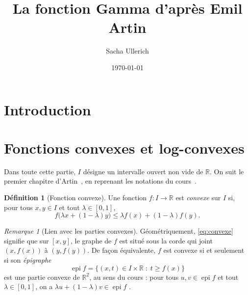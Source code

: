 \documentclass[11pt,a4paper]{amsart}
\theoremstyle{plain}
\theoremstyle{definition}
\newtheorem{definition}[theoreme]{Définition}
\theoremstyle{remark}
\newtheorem{remarque}[theoreme]{Remarque}
\numberwithin{equation}{section}
\newcommand{\R}{\mathbb{R}}
\begin{document}
\title{La fonction Gamma d'après Emil Artin}

\author{Sacha Ullerich}
\address{Faculté des Sciences et Techniques, Université de Limoges}
\date{\today}

\maketitle


\section{Introduction}

\section{Fonctions convexes et log-convexes}

Dans toute cette partie, $I$ désigne un intervalle ouvert non vide de $\R$.
On suit le premier chapitre d'Artin~\cite[ch.~1]{artin}, en reprenant les
notations du cours~\cite{igbida}.

\begin{definition}[Fonction convexe]\label{def:convexe}
Une fonction $f\colon I\to\R$ est \emph{convexe} sur $I$ si, pour tous
$x,y\in I$ et tout $\lambda\in[0,1]$,
\begin{equation}\label{eq:convexe}
  f\bigl(\lambda x+(1-\lambda)y\bigr)\le \lambda f(x)+(1-\lambda)f(y).
\end{equation}
\end{definition}

\begin{remarque}[Lien avec les parties convexes]\label{rem:epigraphe}
Géométriquement, \eqref{eq:convexe} signifie que sur $[x,y]$, le graphe de
$f$ est situé sous la corde qui joint $(x,f(x))$ à $(y,f(y))$. De façon
équivalente, $f$ est convexe si et seulement si son \emph{épigraphe}
\[
  \operatorname{epi} f=\{(x,t)\in I\times\R \;:\; t\ge f(x)\}
\]
est une partie convexe de $\R^2$, au sens du cours : pour tous
$u,v\in\operatorname{epi} f$ et tout $\lambda\in[0,1]$, on a
$\lambda u+(1-\lambda)v\in\operatorname{epi} f$
\cite[exercice~2.11]{igbida}.
\end{remarque}
\end{document}

